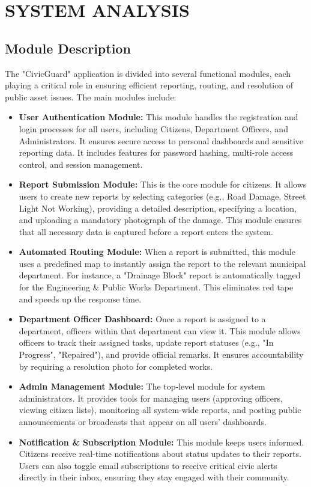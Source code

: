 \chapter{SYSTEM ANALYSIS }
 
 \section{Module Description}
 The "CivicGuard" application is divided into several functional modules, each playing a critical role in ensuring efficient reporting, routing, and resolution of public asset issues. The main modules include:
 \begin{itemize}
    \item \textbf{User Authentication Module:} This module handles the registration and login processes for all users, including Citizens, Department Officers, and Administrators. It ensures secure access to personal dashboards and sensitive reporting data. It includes features for password hashing, multi-role access control, and session management.
    \item \textbf{Report Submission Module:} This is the core module for citizens. It allows users to create new reports by selecting categories (e.g., Road Damage, Street Light Not Working), providing a detailed description, specifying a location, and uploading a mandatory photograph of the damage. This module ensures that all necessary data is captured before a report enters the system.
    \item \textbf{Automated Routing Module:} When a report is submitted, this module uses a predefined map to instantly assign the report to the relevant municipal department. For instance, a "Drainage Block" report is automatically tagged for the Engineering & Public Works Department. This eliminates red tape and speeds up the response time.
    \item \textbf{Department Officer Dashboard:} Once a report is assigned to a department, officers within that department can view it. This module allows officers to track their assigned tasks, update report statuses (e.g., "In Progress", "Repaired"), and provide official remarks. It ensures accountability by requiring a resolution photo for completed works.
    \item \textbf{Admin Management Module:} The top-level module for system administrators. It provides tools for managing users (approving officers, viewing citizen lists), monitoring all system-wide reports, and posting public announcements or broadcasts that appear on all users' dashboards.
    \item \textbf{Notification & Subscription Module:} This module keeps users informed. Citizens receive real-time notifications about status updates to their reports. Users can also toggle email subscriptions to receive critical civic alerts directly in their inbox, ensuring they stay engaged with their community.
\end{itemize}

